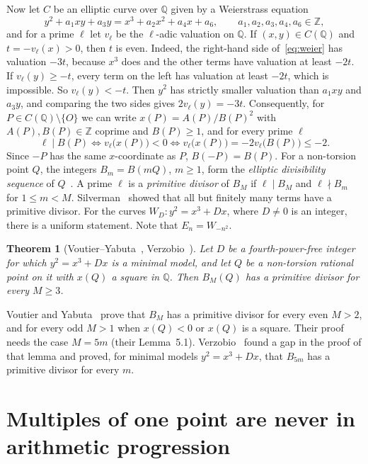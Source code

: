 \documentclass[11pt]{amsart}
\newtheorem{theorem}{Theorem}[section]
\theoremstyle{definition}
\theoremstyle{remark}
\newcommand{\Q}{\mathbb{Q}}
\newcommand{\Z}{\mathbb{Z}}
\begin{document}
Now let $C$ be an elliptic curve over $\Q$ given by a Weierstrass equation
\begin{equation}\label{eq:weier}
y^2+a_1xy+a_3y=x^3+a_2x^2+a_4x+a_6,\qquad a_1,a_2,a_3,a_4,a_6\in\Z,
\end{equation}
and for a prime $\ell$ let $v_\ell$ be the $\ell$-adic valuation on $\Q$. If $(x,y)\in C(\Q)$ and
$t=-v_\ell(x)>0$, then $t$ is even. Indeed, the right-hand side of~\eqref{eq:weier} has valuation $-3t$,
because $x^3$ does and the other terms have valuation at least $-2t$. If $v_\ell(y)\ge-t$, every term on
the left has valuation at least $-2t$, which is impossible. So $v_\ell(y)<-t$. Then $y^2$ has strictly
smaller valuation than $a_1xy$ and $a_3y$, and comparing the two sides gives $2v_\ell(y)=-3t$.
Consequently, for $P\in C(\Q)\setminus\{O\}$ we can write $x(P)=A(P)/B(P)^2$ with $A(P),B(P)\in\Z$
coprime and $B(P)\ge1$, and for every prime $\ell$
\begin{equation}\label{eq:val}
\ell\mid B(P)\iff v_\ell\bigl(x(P)\bigr)<0\iff v_\ell\bigl(x(P)\bigr)=-2v_\ell\bigl(B(P)\bigr)\le-2.
\end{equation}
Since $-P$ has the same $x$-coordinate as $P$, $B(-P)=B(P)$. For a non-torsion point $Q$, the integers
$B_m=B(mQ)$, $m\ge1$, form the \emph{elliptic divisibility sequence} of $Q$~\cite{Ward}. A prime $\ell$ is
a \emph{primitive divisor} of $B_M$ if $\ell\mid B_M$ and $\ell\nmid B_m$ for $1\le m<M$.
Silverman~\cite{Si88} showed that all but finitely many terms have a primitive divisor. For the curves
$W_D\colon y^2=x^3+Dx$, where $D\ne0$ is an integer, there is a uniform statement. Note that
$E_n=W_{-n^2}$.

\begin{theorem}[Voutier--Yabuta~\cite{VY}, Verzobio~\cite{Ve}]\label{thm:VY}
Let $D$ be a fourth-power-free integer for which $y^2=x^3+Dx$ is a minimal model, and let $Q$ be a
non-torsion rational point on it with $x(Q)$ a square in $\Q$. Then $B_M(Q)$ has a primitive divisor for
every $M\ge3$.
\end{theorem}

Voutier and Yabuta~\cite{VY} prove that $B_M$ has a primitive divisor for every even $M>2$, and for every
odd $M>1$ when $x(Q)<0$ or $x(Q)$ is a square. Their proof needs the case $M=5m$ (their Lemma~5.1).
Verzobio~\cite{Ve} found a gap in the proof of that lemma and proved, for minimal models $y^2=x^3+Dx$, that
$B_{5m}$ has a primitive divisor for every $m$.

\section{Multiples of one point are never in arithmetic progression}
\end{document}
